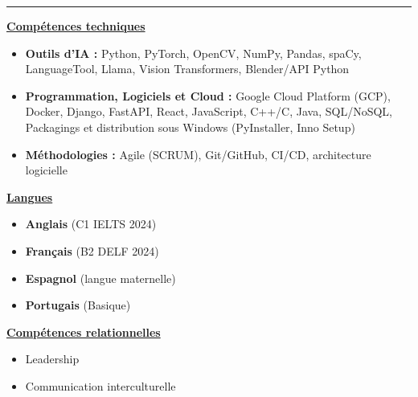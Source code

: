 \documentclass[letterpaper,10pt]{article}
\begin{document}
  

\vspace{4pt}
\noindent\rule{\textwidth}{0.4pt}
\vspace{0.4pt}

\noindent
\begin{minipage}[t]{0.39\textwidth}
  \raggedright
  \textbf{\underline{Compétences techniques}}\\[-2pt]
  {\scriptsize
    \begin{itemize}[leftmargin=*,itemsep=1pt,parsep=0pt,topsep=0pt,partopsep=0pt]
      \item \textbf{Outils d'IA :} Python, PyTorch, OpenCV, NumPy, Pandas, spaCy, LanguageTool, Llama, Vision Transformers, Blender/API Python
      \item \textbf{Programmation, Logiciels et Cloud :} Google Cloud Platform (GCP), Docker, Django, FastAPI, 
        React, JavaScript, C++/C, Java, SQL/NoSQL, Packagings et distribution sous Windows (PyInstaller, Inno Setup)
      \item \textbf{Méthodologies :} Agile (SCRUM), Git/GitHub, CI/CD, architecture logicielle
    \end{itemize}
  }
\end{minipage}\hfill
\begin{minipage}[t]{0.28\textwidth}
  \raggedright
  \textbf{\underline{Langues}}\\[-2pt]
  {\scriptsize
    \begin{itemize}[leftmargin=*,itemsep=0pt,parsep=0pt,topsep=0pt,partopsep=0pt]
      \item \textbf{Anglais} (C1 \textendash{} IELTS 2024)
      \item \textbf{Français} (B2 \textendash{} DELF 2024)
      \item \textbf{Espagnol} (langue maternelle)
      \item \textbf{Portugais} (Basique)
    \end{itemize}
  }

  \vspace{0.12cm}
  \textbf{\underline{Compétences relationnelles}}\\[-2pt]
  {\scriptsize
    \begin{itemize}[leftmargin=*,itemsep=1pt,parsep=0pt,topsep=0pt,partopsep=0pt]
      \item Leadership
      \item Communication interculturelle
    \end{itemize}
  }
\end{minipage}\hfill
\end{document}
